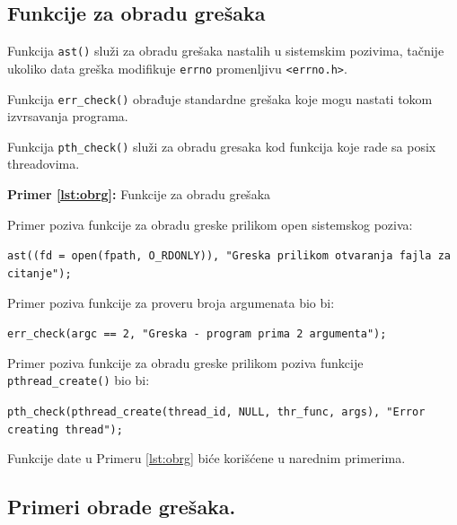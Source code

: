 \documentclass[a4paper, 11pt]{article}
\newcommand{\scode}[3] {
	\hspace{.06\textwidth} 
	\begin{minipage}[t]{.88\textwidth} %
		\begin{mdframed}[topline=true,bottomline=true,leftline=true,rightline=true,backgroundcolor=gray!22, linecolor=gray!60!black,roundcorner=1mm]
			 

	\begin{center}
		\caption{\textbf{Primer \ref{lst:#3}:} #2}
	\end{center}
	\end{mdframed}
	\end{minipage}

}
\begin{document}
\subsection{Funkcije za obradu grešaka}

Funkcija \texttt{ast()} služi za obradu grešaka nastalih u sistemskim pozivima, tačnije ukoliko data greška modifikuje \texttt{errno} promenljivu \texttt{<errno.h>}. 

Funkcija \texttt{err\_check()} obrađuje standardne grešaka koje mogu nastati tokom izvrsavanja programa.

Funkcija \texttt{pth\_check()} služi za obradu gresaka kod funkcija koje rade sa posix threadovima.

\scode{ast.c}{Funkcije za obradu grešaka}{obrg}
\vspace{2mm} 

\vspace{2mm} 
Primer poziva funkcije za obradu greske prilikom open sistemskog poziva: \\

\begin{center}
\vspace{-5mm} 
	\texttt{ast((fd = open(fpath, O\_RDONLY)), "Greska prilikom otvaranja fajla za citanje");} 
\end{center}
Primer poziva funkcije za proveru broja argumenata bio bi: \\

\begin{center}
\vspace{-5mm} 
\texttt{err\_check(argc == 2, "Greska - program prima 2 argumenta");} 
\end{center}
Primer poziva funkcije za obradu greske prilikom poziva funkcije \texttt{pthread\_create()} bio bi: \\

	\begin{center}
		\vspace{-5mm} 
		\texttt{pth\_check(pthread\_create(thread\_id, NULL, thr\_func, args), "Error creating thread");}
	\end{center}

	\vspace{1mm} 

Funkcije date u Primeru \ref{lst:obrg} biće korišćene u narednim primerima.

\newpage

\subsection{Primeri obrade grešaka.}
\end{document}

